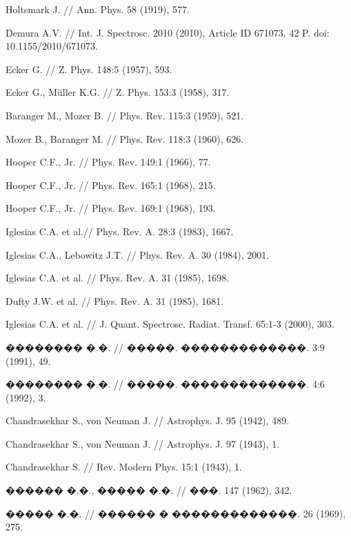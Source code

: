 \documentclass[12pt,titlepage]{article}
\begin{document}

\begin{thebibliography}{99}
 Holtsmark J. // Ann. Phys. 58 (1919), 577.

 Demura A.V. // Int. J. Spectrosc. 2010 (2010), Article ID 671073, 42 P. doi: 10.1155/2010/671073.

 Ecker G. // Z. Phys. 148:5 (1957), 593.

 Ecker G.,  M\"uller K.G. //  Z. Phys. 153:3 (1958), 317.

 Baranger M., Mozer B. // Phys. Rev. 115:3 (1959), 521.

 Mozer B., Baranger M. // Phys. Rev. 118:3 (1960), 626.

 Hooper C.F., Jr. // Phys. Rev. 149:1 (1966), 77.

 Hooper C.F., Jr. // Phys. Rev. 165:1 (1968), 215.

 Hooper C.F., Jr. // Phys. Rev. 169:1 (1968), 193.

 Iglesias C.A. et al.// Phys. Rev. A. 28:3 (1983), 1667.

 Iglesias C.A., Lebowitz J.T. // Phys. Rev. A. 30 (1984), 2001.

 Iglesias C.A. et al. // Phys. Rev. A. 31 (1985), 1698.

 Dufty J.W. et al. // Phys. Rev. A. 31 (1985), 1681.

 Iglesias C.A. et al. // J. Quant. Spectrosc. Radiat. Transf. 65:1-3 (2000), 303.

 �������� �.�. // �����. �������������. 3:9 (1991), 49.

  �������� �.�. // �����. �������������. 4:6 (1992), 3.

 Chandrasekhar S., von Neuman J. // Astrophys. J. 95 (1942), 489.

 Chandrasekhar S., von Neuman J. // Astrophys. J. 97 (1943), 1.

 Chandrasekhar S. // Rev. Modern Phys. 15:1 (1943), 1.

 ������ �.�., ����� �.�. // ���. 147 (1962), 342.

 ����� �.�. // ������ � �������������. 26 (1969), 275.


\end{thebibliography}
\end{document}
